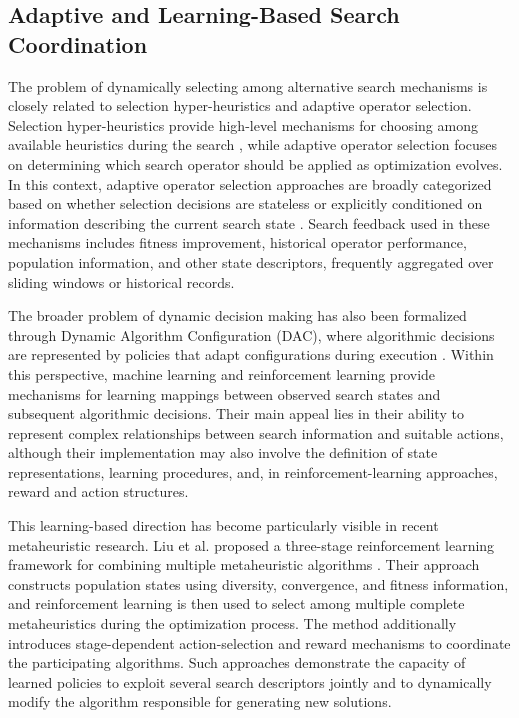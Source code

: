 \documentclass[review]{elsarticle}
\begin{document}
\subsection{Adaptive and Learning-Based Search Coordination}
\label{subsec:adaptive_coordination}

The problem of dynamically selecting among alternative search mechanisms is
closely related to selection hyper-heuristics and adaptive operator
selection. Selection hyper-heuristics provide high-level mechanisms for
choosing among available heuristics during the search
\cite{drake2020recent}, while adaptive operator selection focuses on determining which search operator should be applied as optimization evolves. In this context, adaptive operator selection approaches are broadly categorized based on whether selection decisions are stateless or explicitly conditioned on information describing the current search state \cite{pei2025adaptive}. Search feedback used in these mechanisms includes fitness
improvement, historical operator performance, population information, and
other state descriptors, frequently aggregated over sliding windows or
historical records.

The broader problem of dynamic decision making has also been formalized
through Dynamic Algorithm Configuration (DAC), where algorithmic decisions
are represented by policies that adapt configurations during execution
\cite{adriaensen2022automated}. Within this perspective, machine learning and
reinforcement learning provide mechanisms for learning mappings between
observed search states and subsequent algorithmic decisions. Their main
appeal lies in their ability to represent complex relationships between
search information and suitable actions, although their implementation may
also involve the definition of state representations, learning procedures,
and, in reinforcement-learning approaches, reward and action structures.

This learning-based direction has become particularly visible in recent
metaheuristic research. Liu et al. proposed a three-stage reinforcement
learning framework for combining multiple metaheuristic algorithms
\cite{liu2025three}. Their approach constructs population states using
diversity, convergence, and fitness information, and reinforcement learning
is then used to select among multiple complete metaheuristics during the
optimization process. The method additionally introduces stage-dependent
action-selection and reward mechanisms to coordinate the participating
algorithms. Such approaches demonstrate the capacity of learned policies to
exploit several search descriptors jointly and to dynamically modify the
algorithm responsible for generating new solutions.
\end{document}
